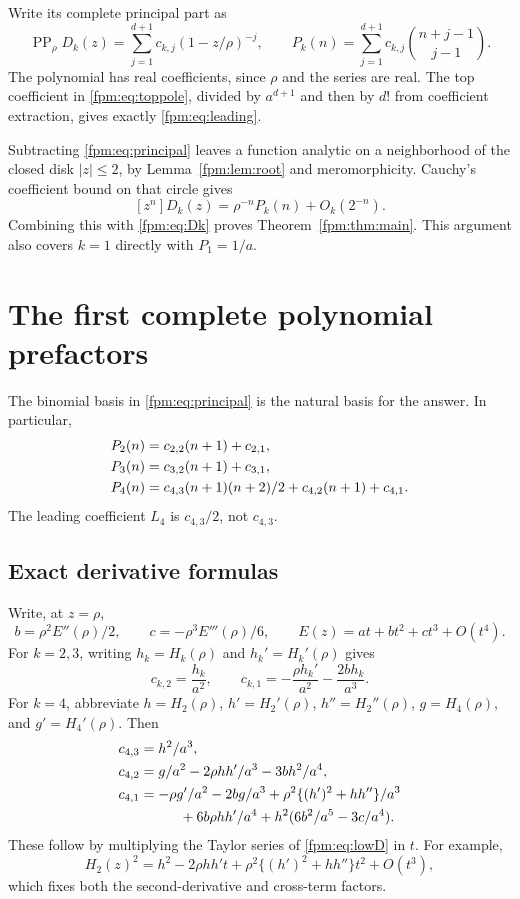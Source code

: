 \documentclass[11pt]{article}
\theoremstyle{definition}\newtheorem{definition}[theorem]{Definition}
\theoremstyle{remark}\newtheorem{remark}[theorem]{Remark}
\begin{document}
Write its complete principal part as
\begin{equation}\label{fpm:eq:principal}
 \operatorname{PP}_{\rho}D_k(z)=\sum_{j=1}^{d+1}c_{k,j}(1-z/\rho)^{-j},
 \qquad
 P_k(n)=\sum_{j=1}^{d+1}c_{k,j}\binom{n+j-1}{j-1}.
\end{equation}
The polynomial has real coefficients, since $\rho$ and the series are real. The top coefficient in \eqref{fpm:eq:toppole}, divided by $a^{d+1}$ and then by $d!$ from coefficient extraction, gives exactly \eqref{fpm:eq:leading}.

Subtracting \eqref{fpm:eq:principal} leaves a function analytic on a neighborhood of the closed disk $|z|\le2$, by Lemma~\ref{fpm:lem:root} and meromorphicity. Cauchy's coefficient bound on that circle gives
\[
 [z^n]D_k(z)=\rho^{-n}P_k(n)+O_k(2^{-n}).
\]
Combining this with \eqref{fpm:eq:Dk} proves Theorem~\ref{fpm:thm:main}. This argument also covers $k=1$ directly with $P_1=1/a$.

\section{The first complete polynomial prefactors}\label{fpm:sec:constants}
The binomial basis in \eqref{fpm:eq:principal} is the natural basis for the answer. In particular,
\begin{align}
 P_2(n)&=c_{2,2}(n+1)+c_{2,1},\notag\\
 P_3(n)&=c_{3,2}(n+1)+c_{3,1},\label{fpm:eq:lowP}\\
 P_4(n)&=c_{4,3}(n+1)(n+2)/2+c_{4,2}(n+1)+c_{4,1}.\notag
\end{align}
The leading coefficient $L_4$ is $c_{4,3}/2$, not $c_{4,3}$.

\subsection{Exact derivative formulas}
Write, at $z=\rho$,
\[
 b=\rho^2E''(\rho)/2,\qquad c=-\rho^3E'''(\rho)/6,
 \qquad E(z)=at+bt^2+ct^3+O(t^4).
\]
For $k=2,3$, writing $h_k=H_k(\rho)$ and $h_k'=H_k'(\rho)$ gives
\begin{equation}\label{fpm:eq:coeff23}
 c_{k,2}=\frac{h_k}{a^2},\qquad
 c_{k,1}=-\frac{\rho h_k'}{a^2}-\frac{2bh_k}{a^3}.
\end{equation}
For $k=4$, abbreviate $h=H_2(\rho)$, $h'=H_2'(\rho)$, $h''=H_2''(\rho)$, $g=H_4(\rho)$, and $g'=H_4'(\rho)$. Then
\begin{align}
 c_{4,3}&=h^2/a^3,\notag\\
 c_{4,2}&=g/a^2-2\rho hh'/a^3-3bh^2/a^4,\label{fpm:eq:coeff4}\\
 c_{4,1}&=-\rho g'/a^2-2bg/a^3
 +\rho^2\{(h')^2+hh''\}/a^3\notag\\
 &\hspace{10mm}+6b\rho hh'/a^4+h^2(6b^2/a^5-3c/a^4).\notag
\end{align}
These follow by multiplying the Taylor series of \eqref{fpm:eq:lowD} in $t$. For example,
\[
 H_2(z)^2=h^2-2\rho hh't+\rho^2\{(h')^2+hh''\}t^2+O(t^3),
\]
which fixes both the second-derivative and cross-term factors.
\end{document}
